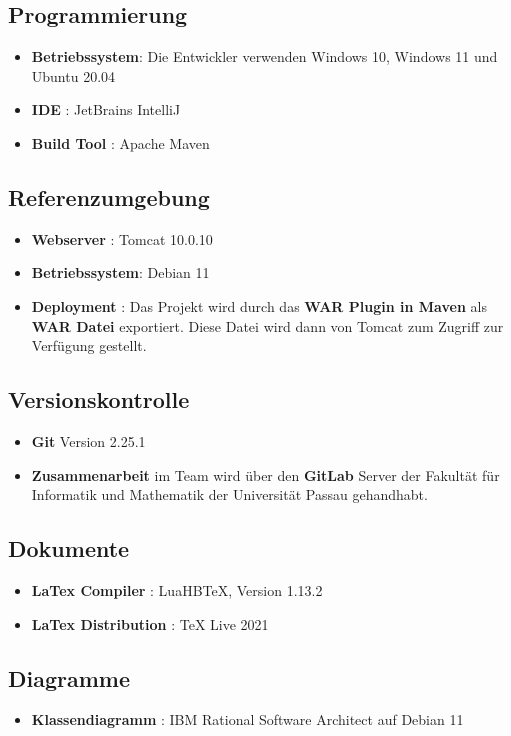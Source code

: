 \subsection{Programmierung}
\begin{itemize}
	\item \textbf{Betriebssystem}: Die Entwickler verwenden Windows 10, Windows 11 und Ubuntu 20.04
	\item \textbf{IDE }: JetBrains IntelliJ
	\item \textbf{Build Tool }: Apache Maven
\end{itemize}
\subsection{Referenzumgebung}
\begin{itemize}
	\item \textbf{Webserver }: Tomcat 10.0.10
	\item \textbf{Betriebssystem}: Debian 11
	\item \textbf{Deployment }: Das Projekt wird durch das \textbf{WAR Plugin in Maven} als \textbf{WAR Datei } exportiert. Diese Datei wird dann von Tomcat zum Zugriff zur Verfügung gestellt.
\end{itemize}
\subsection{Versionskontrolle}
\begin{itemize}
	\item \textbf{Git} Version 2.25.1
	\item \textbf{Zusammenarbeit} im Team wird über den \textbf{GitLab } Server der Fakultät für Informatik und Mathematik der Universität Passau gehandhabt.
\end{itemize}
\subsection{Dokumente}
\begin{itemize}
	\item \textbf{LaTex Compiler }: LuaHBTeX, Version 1.13.2
	\item \textbf{LaTex Distribution }: TeX Live 2021
\end{itemize}
\subsection{Diagramme}
\begin{itemize}
	\item \textbf{Klassendiagramm }: IBM Rational Software Architect auf Debian 11
\end{itemize}